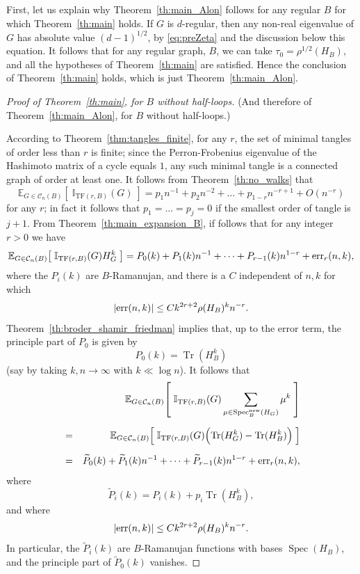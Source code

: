 \documentclass{memo-l}
\theoremstyle{plain}
\theoremstyle{definition}
\numberwithin{section}{chapter}
\numberwithin{equation}{chapter}
\newcommand{\expect}[2]{{\mathbb{E}}_{#1}{\left[\; #2\; \right]}}
\newcommand{\rhoroot}[1]{\rho^{1/2}(H_{#1})}
\newcommand{\tanglefreeindicator}{\II_{\mathrm{TF}(r,B)}} %
\DeclareMathOperator{\Tr}{Tr}
\DeclareMathOperator{\Spec}{Spec}
\newcommand{\Specnew}{\Spec^{\mathrm{new}}}
\theoremstyle{plain}
\theoremstyle{definition}
\newcommand\II{\mathbb{I}}
\newcommand\cC{\mathcal{C}}
\begin{document}
First, let us explain why Theorem~\ref{th:main_Alon} follows for
any regular $B$ for which Theorem~\ref{th:main} holds.
If $G$ is $d$-regular, then any non-real eigenvalue
of $G$ has absolute value $(d-1)^{1/2}$, by \eqref{eq:preZeta}
and the discussion below this equation.  
It follows that for any regular graph,
$B$, we can take $\tau_0=\rhoroot B$, and all the hypotheses of
Theorem~\ref{th:main} are satisfied.  Hence the conclusion of
Theorem~\ref{th:main} holds, which is just
Theorem~\ref{th:main_Alon}.

\begin{proof}[Proof of Theorem~\ref{th:main}, for $B$ without
half-loops] (And therefore of Theorem~\ref{th:main_Alon}, for $B$
without half-loops.)

According to Theorem~\ref{thm:tangles_finite}, for any $r$, the set of
minimal tangles of order less than $r$ is finite; since the Perron-Frobenius
eigenvalue of the Hashimoto matrix of a cycle equals $1$, any such
minimal tangle is a connected graph of order at least one.
It follows from Theorem~\ref{th:no_walks} that
\begin{equation}\label{eq:tangle_free_only}
\expect{G\in\cC_n(B)}{\tanglefreeindicator(G)} =
p_1 n^{-1} + p_2 n^{-2} + \ldots + p_{1-r} n^{-r+1} + O(n^{-r})
\end{equation}
for any $r$; in fact it follows that $p_1=\ldots=p_j=0$
if the smallest order of tangle is $j+1$.
From Theorem~\ref{th:main_expansion_B}, if follows
that for any 
integer $r>0$ we have
\begin{equation}\label{eq:power_series_proof}
\expect{G\in\cC_n(B)}{\tanglefreeindicator(G)H_G^k} =
P_0(k) + P_1(k)n^{-1} + \cdots 
+ P_{r-1}(k) n^{1-r} + {\rm err}_r(n,k),
\end{equation}
where the \( P_i(k) \) are \( B \)-Ramanujan, and there is a \( C \)
independent of \( n,k \) for which 
\begin{equation}\label{eq:error_bound_exp}
|{\rm err}(n,k)| \leq Ck^{2r+2}
\rho(H_B)^k n^{-r}. 
\end{equation}
Theorem~\ref{th:broder_shamir_friedman} implies that, up to the error
term, the principle part of $P_0$ is given by
$$
P_0(k) = \Tr(H_B^k) 
$$
(say by taking $k,n\to\infty$ with $k \ll \log n$).
It follows that 
\begin{eqnarray}
&& \expect{G\in\cC_n(B)}{\tanglefreeindicator(G)
\sum_{\mu\in\Specnew_B(H_G)} \mu^k} \\[.2cm]
&=& 
\expect{G\in\cC_n(B)}{\tanglefreeindicator(G)
\Bigl(\Tr(H_G^k)-\Tr(H_B^k)\Bigr)} \\[.2cm]
&=&
\widetilde P_0(k) + \widetilde P_1(k)n^{-1} + \cdots 
+ \widetilde P_{r-1}(k) n^{1-r} + {\rm err}_r(n,k),
\end{eqnarray}
where 
\begin{equation}\label{eq:widetilde_P_defined}
\widetilde P_i(k) = P_i(k) + p_i \Tr(H_B^k),
\end{equation}
and where
$$
|{\rm err}(n,k)| \leq Ck^{2r+2}
\rho(H_B)^k n^{-r}. 
$$
In particular, the $\widetilde P_i(k)$ are $B$-Ramanujan functions with
bases $\Spec(H_B)$, and the
principle part of $\widetilde P_0(k)$ vanishes.


\end{proof}
\end{document}
